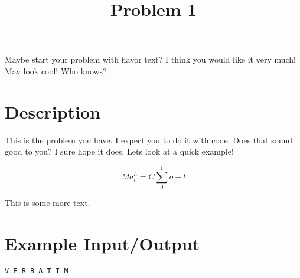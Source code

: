 \documentclass{codeproblem}
\begin{document}
\title{Problem 1}

\begin{flavor}
  Maybe start your problem with flavor text? I think you would like it
  very much! May look cool! Who knows?
\end{flavor}

\section*{Description}
This is the problem you have. I expect you to do it with code. Does
that sound good to you? I sure hope it does. Lets look at a quick
example!

\begin{example}
  \[Ma_t^h = C\sum_0^1o + l\]
\end{example}

This is some more text.

\section*{Example Input/Output}

\begin{example}
\begin{verbatim}
V E R B A T I M
\end{verbatim}
\end{example}
\end{document}
